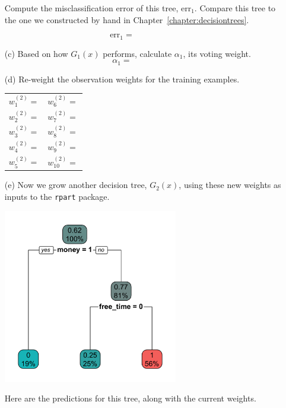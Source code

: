 \begin{enumerate}
\noindent Compute the misclassification error of this tree, $\text{err}_1$. Compare this tree to the one we constructed by hand in Chapter~\ref{chapter:decisiontrees}.

$$ \text{err}_1 = \qquad \qquad \qquad $$
\vspace{3mm}

\item[(c)] Based on how $G_1(x)$ performs, calculate $\alpha_1$, its voting weight.
$$ \alpha_1 = \qquad \qquad \qquad $$

\item[(d)] Re-weight the observation weights for the training examples.
\begin{center}
\begin{tabular}{p{}p{}}
$w_1^{(2)} = $ \hfill & $w_6^{(2)} = $ \hfill \\
$w_2^{(2)} = $ \hfill & $w_7^{(2)} = $ \hfill \\
$w_3^{(2)} = $ \hfill & $w_8^{(2)} = $ \hfill \\
$w_4^{(2)} = $ \hfill & $w_9^{(2)} = $ \hfill \\
$w_5^{(2)} = $ \hfill & $w_{10}^{(2)} = $ \hfill \\
\end{tabular}
\end{center}

\item[(e)] Now we grow another decision tree, $G_2(x)$, using these new weights as inputs to the \texttt{rpart} package.

\begin{center}
\includegraphics[width=0.6\textwidth]{img/happiness-boosting-tree-2.png}
\end{center}

Here are the predictions for this tree, along with the current weights.


\end{enumerate}
